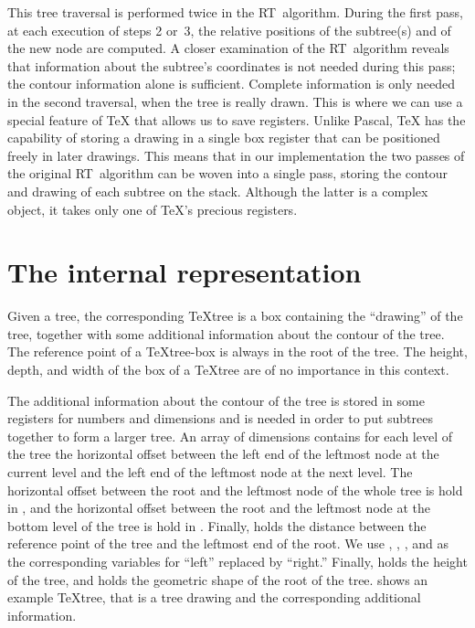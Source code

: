 This tree traversal is performed twice in the RT~algorithm.
During the first pass,
at each execution of steps 2 or~3, the relative positions of the
subtree(s) and of the new node are computed.
A closer examination of the RT~algorithm reveals that information about the
subtree's coordinates is not needed during this pass; the contour information
alone is sufficient. Complete information is only needed in the second
traversal, when the tree is really drawn. This is where we can use
a special feature of \TeX{} that allows us to save registers.
Unlike Pascal, \TeX{} has the capability of
storing a drawing in a single box register that can be positioned freely in
later drawings. This means that in our implementation the two passes
of the original RT~algorithm can be woven into a single pass,
storing the contour and drawing of each subtree on the stack.
Although the latter is a complex object, it takes only one of
\TeX's precious registers.


\section{The internal representation}

Given a tree, the corresponding \TeX{}tree is a box containing
the ``drawing'' of the tree, together with some additional
information about the contour of the tree.
The reference point of a \TeX{}tree-box is always in the root of the
tree. The height, depth, and width of the box of a \TeX{}tree are
of no importance in this context.

The additional information about the contour of the tree is stored in some
registers for numbers and dimensions and
is needed in order to put subtrees together to form a larger tree.
An array  of dimensions contains for each
level of the tree the horizontal offset between the
left end of the leftmost node at the current level and the
left end of the leftmost node at the next level.
The horizontal offset between the root
and the leftmost node of the whole tree is hold in , and 
the horizontal offset between the root and the leftmost node at
the bottom level of the tree is hold in .
Finally,  holds the distance between the reference point
of the tree and the leftmost end of the root.
We use
, , , and 
as the corresponding variables for ``left'' replaced by ``right.'' Finally,
 holds the height of the tree, and  holds the
geometric shape of the root of the tree.  shows an example 
\TeX{}tree, that is a tree drawing and the corresponding additional information.

